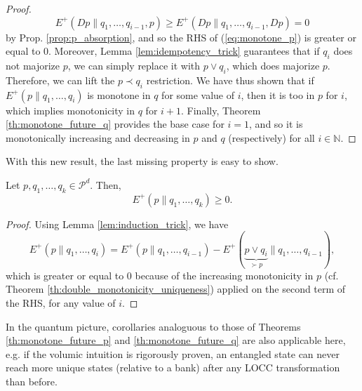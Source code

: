\begin{proof}
    \begin{equation}
        E^+(Dp \parallel q_1, \dots, q_{i-1}, p) \geq E^+(Dp \parallel q_1, \dots, q_{i-1}, Dp) = 0
    \end{equation}
    by Prop. \ref{prop:p_absorption}, and so the RHS of (\ref{eq:monotone_p}) is greater or equal to 0. Moreover, Lemma \ref{lem:idempotency_trick} guarantees that if $q_i$ does not majorize $p$, we can simply replace it with $p \vee q_i$, which does majorize $p$. Therefore, we can lift the $p \prec q_i$ restriction. We have thus shown that if $E^+(p \parallel q_1, \dots, q_i)$ is monotone in $q$ for some value of $i$, then it is too in $p$ for $i$, which implies monotonicity in $q$ for $i+1$. Finally, Theorem \ref{th:monotone_future_q} provides the base case for $i = 1$, and so it is monotonically increasing and decreasing in $p$ and $q$ (respectively) for all $i \in \mathbb{N}$. \qedhere
\end{proof}

\noindent With this new result, the last missing property is easy to show.

\begin{theorem} \label{th:positivity_uniqueness}
    Let $p, q_1, \dots, q_k \in \mathcal{P}^d$. Then,
    \begin{equation}
        E^+(p \parallel q_1, \dots, q_k) \geq 0.
    \end{equation}
\end{theorem}

\begin{proof}
    Using Lemma \ref{lem:induction_trick}, we have
    \begin{equation}
        E^+(p \parallel q_1, \dots, q_i) = E^+(p \parallel q_1, \dots, q_{i-1}) - E^+(\underbrace{p \vee q_{i}}_{\succ p} \parallel q_1, \dots, q_{i-1}),
    \end{equation}
    which is greater or equal to 0 because of the increasing monotonicity in $p$ (cf. Theorem \ref{th:double_monotonicity_uniqueness}) applied on the second term of the RHS, for any value of $i$. \qedhere
\end{proof}

In the quantum picture, corollaries analoguous to those of Theorems \ref{th:monotone_future_p} and \ref{th:monotone_future_q} are also applicable here, e.g. if the volumic intuition is rigorously proven, an entangled state can never reach more unique states (relative to a bank) after any LOCC transformation than before.



